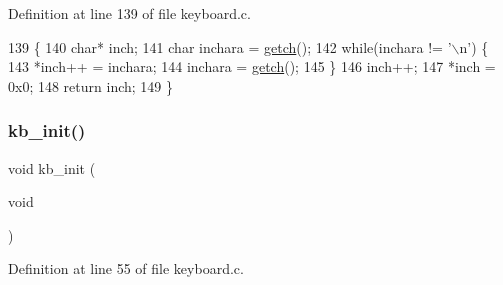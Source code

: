 Definition at line 139 of file keyboard.\+c.


\begin{DoxyCode}
139               \{
140     \textcolor{keywordtype}{char}* inch;
141     \textcolor{keywordtype}{char} inchara = \hyperlink{a00038_af3facad10e05defa48d45b46eb9ebe7e_af3facad10e05defa48d45b46eb9ebe7e}{getch}();
142     \textcolor{keywordflow}{while}(inchara != \textcolor{charliteral}{'\(\backslash\)n'}) \{
143         *inch++ = inchara;
144         inchara = \hyperlink{a00038_af3facad10e05defa48d45b46eb9ebe7e_af3facad10e05defa48d45b46eb9ebe7e}{getch}();
145     \}
146     inch++;
147     *inch = 0x0;
148     \textcolor{keywordflow}{return} inch;
149 \}
\end{DoxyCode}
\mbox{\label{a00041_aabdb223e5290f3b3c07bc82d075b87d7_aabdb223e5290f3b3c07bc82d075b87d7}} 
\subsubsection{\texorpdfstring{kb\+\_\+init()}{kb\_init()}}
{\footnotesize\ttfamily void kb\+\_\+init (\begin{DoxyParamCaption}\item[{void}]{ }\end{DoxyParamCaption})}



Definition at line 55 of file keyboard.\+c.


